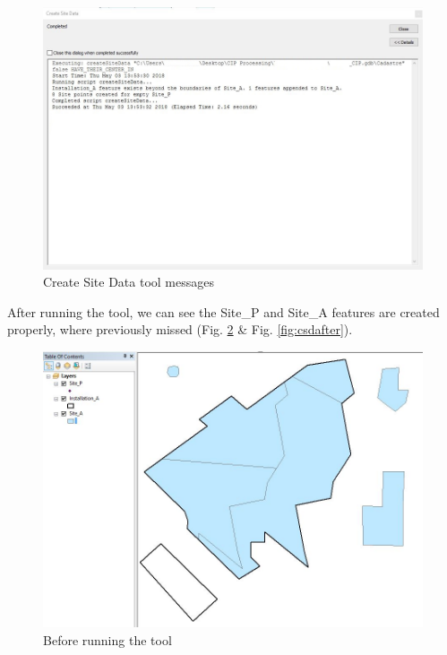 \documentclass[openany]{book}
\theoremstyle{definition}
\theoremstyle{definition}
\theoremstyle{definition}
\theoremstyle{remark}
\begin{document}
\begin{figure}[H]

{\centering \includegraphics{figures/csd-messages} 

}

\caption{Create Site Data tool messages}\label{fig:csdmessages}
\end{figure}

After running the tool, we can see the Site\_P and Site\_A features are
created properly, where previously missed (Fig. \ref{fig:csdbefore} \&
Fig. \ref{fig:csdafter}).

\begin{figure}[H]

{\centering \includegraphics{figures/csd-before} 

}

\caption{Before running the tool}\label{fig:csdbefore}
\end{figure}
\end{document}
